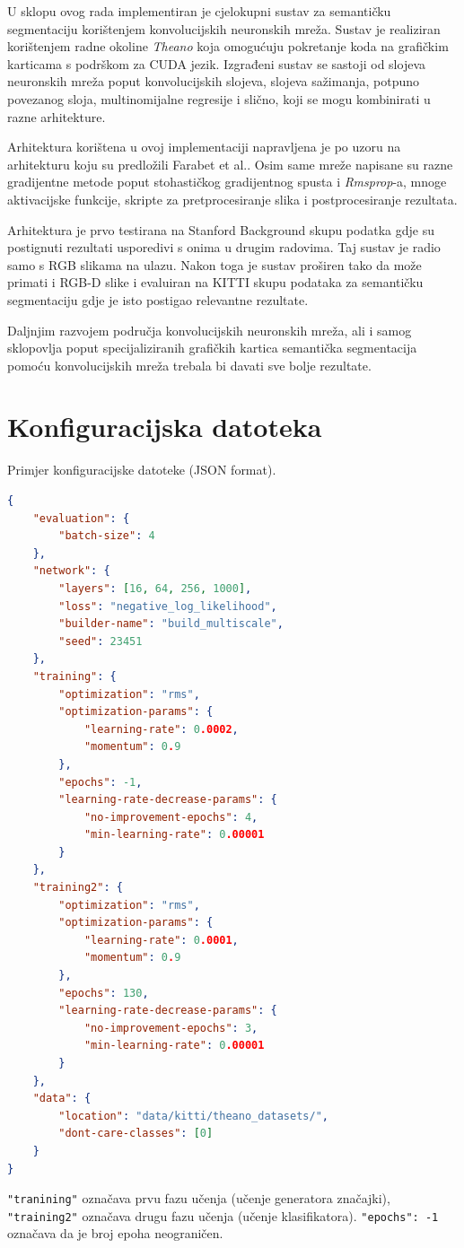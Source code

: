 \documentclass[times, utf8, diplomski, numeric]{fer}
\begin{document}
U sklopu ovog rada implementiran je cjelokupni sustav za semantičku segmentaciju korištenjem konvolucijskih neuronskih mreža. Sustav je realiziran korištenjem radne okoline \textit{Theano} koja omogućuju pokretanje koda na grafičkim karticama s podrškom za CUDA jezik. Izgrađeni sustav se sastoji od slojeva neuronskih mreža poput konvolucijskih slojeva, slojeva sažimanja, potpuno povezanog sloja, multinomijalne regresije i slično, koji se mogu kombinirati u razne arhitekture.

Arhitektura korištena u ovoj implementaciji napravljena je po uzoru na arhitekturu koju su predložili Farabet et al.\cite{farabet_pami}. Osim same mreže napisane su razne gradijentne metode poput stohastičkog gradijentnog spusta i \textit{Rmsprop}-a, mnoge aktivacijske funkcije, skripte za pretprocesiranje slika i postprocesiranje rezultata.

Arhitektura je prvo testirana na Stanford Background skupu podatka gdje su postignuti rezultati usporedivi s onima u drugim radovima. Taj sustav je radio samo s RGB slikama na ulazu. Nakon toga je sustav proširen tako da može primati i RGB-D slike i evaluiran na KITTI skupu podataka za semantičku segmentaciju gdje je isto postigao relevantne rezultate.

Daljnjim razvojem područja konvolucijskih neuronskih mreža, ali i samog sklopovlja poput specijaliziranih grafičkih kartica semantička segmentacija pomoću konvolucijskih mreža trebala bi davati sve bolje rezultate.




\appendix
\chapter{Konfiguracijska datoteka}
\label{chap:konfiguracijska datoteka}

Primjer konfiguracijske datoteke (JSON format).
\begin{lstlisting}[language=json]
{
    "evaluation": {
        "batch-size": 4
    },
    "network": {
        "layers": [16, 64, 256, 1000],
        "loss": "negative_log_likelihood",
        "builder-name": "build_multiscale",
        "seed": 23451
    },
    "training": {
        "optimization": "rms",
        "optimization-params": {
            "learning-rate": 0.0002,
            "momentum": 0.9
        },
        "epochs": -1,
        "learning-rate-decrease-params": {
            "no-improvement-epochs": 4,
            "min-learning-rate": 0.00001
        }
    },
    "training2": {
        "optimization": "rms",
        "optimization-params": {
            "learning-rate": 0.0001,
            "momentum": 0.9
        },
        "epochs": 130,
        "learning-rate-decrease-params": {
            "no-improvement-epochs": 3,
            "min-learning-rate": 0.00001
        }
    },
    "data": {
        "location": "data/kitti/theano_datasets/",
        "dont-care-classes": [0]
    }
}
\end{lstlisting}
\texttt{"tranining"} označava prvu fazu učenja (učenje generatora značajki), \texttt{"training2"} označava drugu fazu učenja (učenje klasifikatora). \texttt{"epochs": -1} označava da je broj epoha neograničen.
\end{document}
